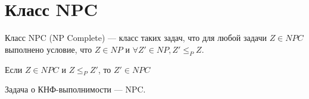 \section{Класс NPC}
\begin{definition}
	Класс NPC (NP Complete) --- класс таких задач, что для любой задачи
	$Z\in NPC$ выполнено условие, что $Z\in NP$ и $\forall Z'\in NP, Z'
	\le_P Z$.
\end{definition}

\begin{lemma}
	Если $Z\in NPC$ и  $Z \le_P Z'$, то  $Z' \in NPC$
\end{lemma}

\begin{theorem}
Задача о КНФ-выполнимости --- NPC.
\end{theorem}
